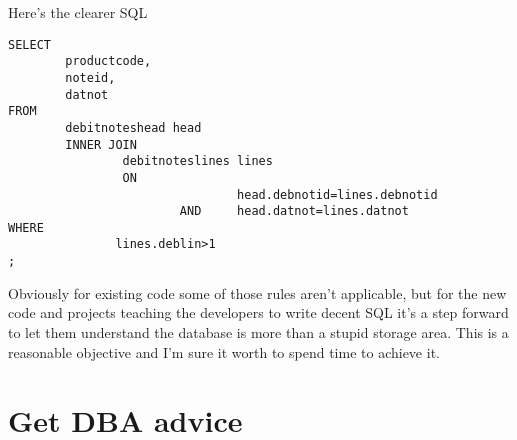 Here's the clearer SQL
\begin{lstlisting}[style=pgsql]
SELECT
        productcode,
        noteid,
        datnot
FROM
        debitnoteshead head
        INNER JOIN
                debitnoteslines lines
                ON
                                head.debnotid=lines.debnotid
                        AND     head.datnot=lines.datnot
WHERE
               lines.deblin>1
;
\end{lstlisting}

Obviously for existing code some of those rules aren't applicable, but for the new code and 
projects teaching the developers to write decent SQL it's a step forward to let them understand the 
database is more than a stupid storage area.
This is a reasonable objective and I'm sure it worth to spend time to achieve it.


\section{Get DBA advice}
\label{sec:GETDBA}